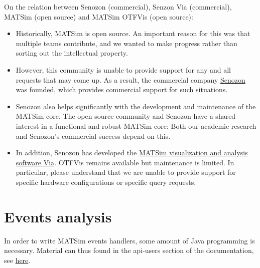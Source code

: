 On the relation between Senozon (commercial), Senzon Via (commercial), MATSim (open source) and MATSim OTFVis (open source):
\begin{itemize}
	\item Historically, MATSim is open source. An important reason  for this was that multiple teams contribute, and we wanted to make  progress rather than sorting out the intellectual property.
	\item However, this community is unable to provide support for any and all  requests that may come up. As a result, the commercial company \href{http://www.senzon.com/}{Senozon} was founded, which provides commercial support for such situations.
	\item Senozon also helps significantly with the development and  maintenance of the MATSim core. The open source community and Senozon have a shared interest in a functional and robust MATSim core: Both our  academic research and Senozon's commercial success depend on this.
	\item In addition, Senozon has developed the \href{http://senozon.com/products/via}{MATSim visualization and analysis software Via}.  OTFVis remains available but maintenance is limited. In  particular, please understand that we are unable to provide support for  specific hardware configurations or specific query requests.
\end{itemize}

\vfill\eject
\section{Events analysis}

In  order to write MATSim events handlers, some amount of Java programming  is necessary. Material can thus found in the api-users section of  the documentation, see \href{http://www.matsim.org/node/17}{here}.
